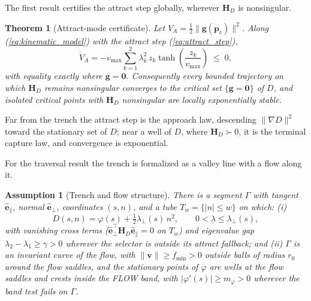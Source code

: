 \documentclass[lettersize,journal]{IEEEtran}
\newtheorem{theorem}{Theorem}
\newtheorem{assumption}{Assumption}
\begin{document}
The first result certifies the attract step globally, wherever
$\mathbf{H}_D$ is nonsingular.

\begin{theorem}[Attract-mode certificate]
\label{thm:attract}
Let $V_A = \tfrac{1}{2}\|\mathbf{g}(\mathbf{p}_c)\|^2$. Along
(\ref{eq:kinematic_model}) with the attract step
(\ref{eq:attract_step}),
\begin{equation}
    \dot{V}_A = -v_{\max} \sum_{k=1}^{2} \lambda_k^2\,
    z_k \tanh\!\left(\frac{z_k}{v_{\max}}\right) \;\leq\; 0,
    \label{eq:VA_dot}
\end{equation}
with equality exactly where $\mathbf{g} = \mathbf{0}$. Consequently
every bounded trajectory on which $\mathbf{H}_D$ remains nonsingular
converges to the critical set $\{\mathbf{g} = \mathbf{0}\}$ of $D$, and
isolated critical points with $\mathbf{H}_D$ nonsingular are locally
exponentially stable.
\end{theorem}

Far from the trench the attract step is the approach law, descending
$\|\nabla D\|^2$ toward the stationary set of $D$; near a well of $D$,
where $\mathbf{H}_D \succ 0$, it is the terminal capture law, and
convergence is exponential.

For the traversal result the trench is formalized as a valley line with
a flow along it.

\begin{assumption}[Trench and flow structure]
\label{ass:trench}
There is a segment $\Gamma$ with tangent $\hat{\mathbf{e}}_\parallel$,
normal $\hat{\mathbf{e}}_\perp$, coordinates $(s, n)$, and a tube
$T_w = \{|n| \leq w\}$ on which: (i)
\begin{equation}
    D(s, n) = \varphi(s) + \tfrac{1}{2}\lambda_\perp(s)\,n^2,
    \qquad 0 < \underline{\lambda} \leq \lambda_\perp(s),
    \label{eq:normal_form}
\end{equation}
with vanishing cross terms
($\hat{\mathbf{e}}_\perp^\top \mathbf{H}_D \hat{\mathbf{e}}_\parallel
= 0$ on $T_w$) and eigenvalue gap $\lambda_2 - \lambda_1 \geq \gamma >
0$ wherever the selector is outside its attract fallback; and (ii)
$\Gamma$ is an invariant curve of the flow, with $\|\mathbf{v}\| \geq
f_{\min} > 0$ outside balls of radius $r_0$ around the flow saddles,
and the stationary points of $\varphi$ are wells at the flow saddles
and crests inside the FLOW band, with $|\varphi'(s)| \geq m_\varphi >
0$ wherever the band test fails on $\Gamma$.
\end{assumption}
\end{document}

